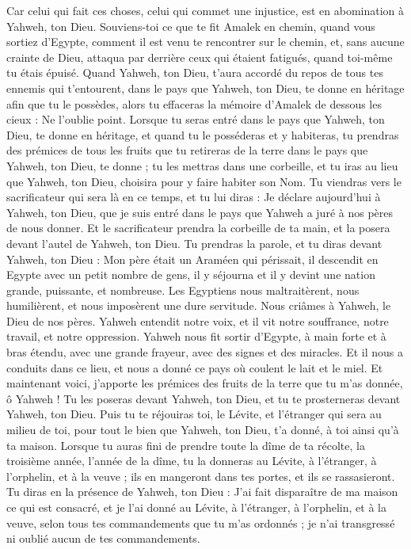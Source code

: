 \begin{multicols}{2}
Car celui qui fait ces choses, celui qui commet une injustice, est en abomination à Yahweh, ton Dieu.
Souviens-toi ce que te fit Amalek en chemin, quand vous sortiez d'Egypte,
comment il est venu te rencontrer sur le chemin, et, sans aucune crainte de Dieu, attaqua par derrière ceux qui étaient fatigués, quand toi-même tu étais épuisé.
Quand Yahweh, ton Dieu, t'aura accordé du repos de tous tes ennemis qui t’entourent, dans le pays que Yahweh, ton Dieu, te donne en héritage afin que tu le possèdes, alors tu effaceras la mémoire d'Amalek de dessous les cieux : Ne l'oublie point.
\VerseOne{}Lorsque tu seras entré dans le pays que Yahweh, ton Dieu, te donne en héritage, et quand tu le posséderas et y habiteras,
tu prendras des prémices de tous les fruits que tu retireras de la terre dans le pays que Yahweh, ton Dieu, te donne ; tu les mettras dans une corbeille, et tu iras au lieu que Yahweh, ton Dieu, choisira pour y faire habiter son Nom.
Tu viendras vers le sacrificateur qui sera là en ce temps, et tu lui diras : Je déclare aujourd'hui à Yahweh, ton Dieu, que je suis entré dans le pays que Yahweh a juré à nos pères de nous donner.
Et le sacrificateur prendra la corbeille de ta main, et la posera devant l'autel de Yahweh, ton Dieu.
Tu prendras la parole, et tu diras devant Yahweh, ton Dieu : Mon père était un Araméen qui périssait, il descendit en Egypte avec un petit nombre de gens, il y séjourna et il y devint une nation grande, puissante, et nombreuse.
Les Egyptiens nous maltraitèrent, nous humilièrent, et nous imposèrent une dure servitude.
Nous criâmes à Yahweh, le Dieu de nos pères. Yahweh entendit notre voix, et il vit notre souffrance, notre travail, et notre oppression.
Yahweh nous fit sortir d'Egypte, à main forte et à bras étendu, avec une grande frayeur, avec des signes et des miracles.
Et il nous a conduits dans ce lieu, et nous a donné ce pays où coulent le lait et le miel.
Et maintenant voici, j'apporte les prémices des fruits de la terre que tu m'as donnée, ô Yahweh ! Tu les poseras devant Yahweh, ton Dieu, et tu te prosterneras devant Yahweh, ton Dieu.
Puis tu te réjouiras toi, le Lévite, et l’étranger qui sera au milieu de toi, pour tout le bien que Yahweh, ton Dieu, t'a donné, à toi ainsi qu’à ta maison.
Lorsque tu auras fini de prendre toute la dîme de ta récolte, la troisième année, l'année de la dîme, tu la donneras au Lévite, à l'étranger, à l'orphelin, et à la veuve ; ils en mangeront dans tes portes, et ils se rassasieront.
Tu diras en la présence de Yahweh, ton Dieu : J'ai fait disparaître de ma maison ce qui est consacré, et je l'ai donné au Lévite, à l'étranger, à l'orphelin, et à la veuve, selon tous tes commandements que tu m'as ordonnés ; je n'ai transgressé ni oublié aucun de tes commandements.

\end{multicols}
